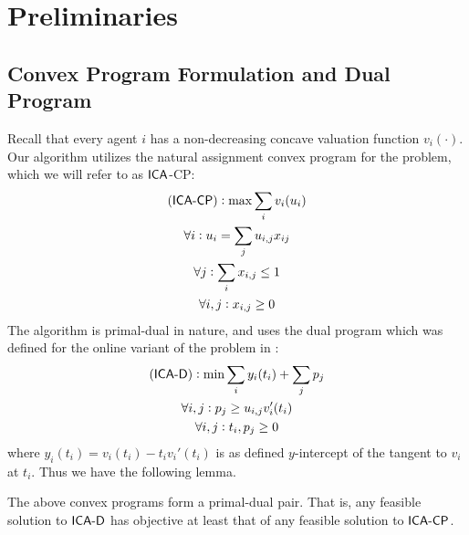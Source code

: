 \section{Preliminaries}
\label{sec:prelim}

\subsection{Convex Program Formulation and Dual Program}
\label{subsec:prelim-convex-dual}

Recall that every agent $i$ has a non-decreasing concave valuation function $v_i(\cdot)$. Our algorithm utilizes the natural assignment convex program for the problem, which we will refer to as 
$\mathsf{ICA}$-CP: 
\begin{gather*}
    \textnormal{($\mathsf{ICA\text{-}CP}$)}: \max \sum_i v_i(u_i) \\
    \forall i: u_i = \sum_j u_{i,j}x_{ij} \\
    \forall j: \sum_i x_{i,j} \leq 1 \\
    \forall i,j: x_{i,j} \geq 0 
\end{gather*}
The algorithm is primal-dual in nature, and uses the dual program which was defined for the online variant of the problem in \cite{devanur2012online}:
\begin{gather*}
    \textnormal{($\mathsf{ICA\text{-}D}$)}: \min \sum_i y_i(t_i) + \sum_j p_j \\
    \forall i,j: p_j \geq u_{i,j}v_i'(t_i) \\
    \forall i,j: t_i, p_j \geq 0 
\end{gather*}
where $y_i(t_i) = v_i(t_i) - t_iv_i'(t_i)$ is as defined $y$-intercept of the tangent to $v_i$ at $t_i$. Thus we have the following lemma. 


\begin{lemma} \label{lem:duality}
The above convex programs form a primal-dual pair. That is, any feasible solution to $\mathsf{ICA\text{-}D}$ has objective at least that of any feasible solution to $\mathsf{ICA\text{-}CP}$.
\end{lemma}

